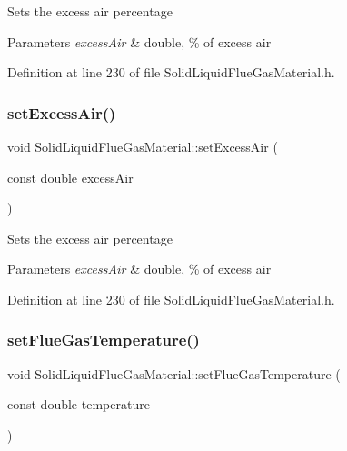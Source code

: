 Sets the excess air percentage 
\begin{DoxyParams}{Parameters}
{\em excess\+Air} & double, \% of excess air \\
\hline
\end{DoxyParams}


Definition at line 230 of file Solid\+Liquid\+Flue\+Gas\+Material.\+h.

\mbox{\label{class_solid_liquid_flue_gas_material_a7a3f9f77d267afc05f5fde1da9329ec5}} 
\subsubsection{\texorpdfstring{set\+Excess\+Air()}{setExcessAir()}\hspace{0.1cm}{\footnotesize\ttfamily [3/3]}}
{\footnotesize\ttfamily void Solid\+Liquid\+Flue\+Gas\+Material\+::set\+Excess\+Air (\begin{DoxyParamCaption}\item[{const double}]{excess\+Air }\end{DoxyParamCaption})\hspace{0.3cm}{\ttfamily [inline]}}

Sets the excess air percentage 
\begin{DoxyParams}{Parameters}
{\em excess\+Air} & double, \% of excess air \\
\hline
\end{DoxyParams}


Definition at line 230 of file Solid\+Liquid\+Flue\+Gas\+Material.\+h.

\mbox{\label{class_solid_liquid_flue_gas_material_ae647700dbff5ccea7938b2117f2c3156}} 
\subsubsection{\texorpdfstring{set\+Flue\+Gas\+Temperature()}{setFlueGasTemperature()}\hspace{0.1cm}{\footnotesize\ttfamily [1/3]}}
{\footnotesize\ttfamily void Solid\+Liquid\+Flue\+Gas\+Material\+::set\+Flue\+Gas\+Temperature (\begin{DoxyParamCaption}\item[{const double}]{temperature }\end{DoxyParamCaption})\hspace{0.3cm}{\ttfamily [inline]}}

